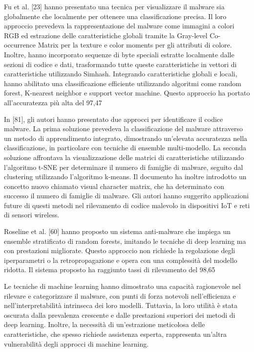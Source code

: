 Fu et al. [23] hanno presentato una tecnica per visualizzare il malware sia globalmente che localmente per ottenere una classificazione precisa. Il loro approccio prevedeva la rappresentazione del malware come immagini a colori RGB ed estrazione delle caratteristiche globali tramite la Gray-level Co-occurrence Matrix per la texture e color moments per gli attributi di colore. Inoltre, hanno incorporato sequenze di byte speciali estratte localmente dalle sezioni di codice e dati, trasformando tutte queste caratteristiche in vettori di caratteristiche utilizzando Simhash. Integrando caratteristiche globali e locali, hanno abilitato una classificazione efficiente utilizzando algoritmi come random forest, K-nearest neighbor e support vector machine. Questo approccio ha portato all'accuratezza più alta del 97,47%

In [81], gli autori hanno presentato due approcci per identificare il codice malware. La prima soluzione prevedeva la classificazione del malware attraverso un metodo di apprendimento integrato, dimostrando un'elevata accuratezza nella classificazione, in particolare con tecniche di ensemble multi-modello. La seconda soluzione affrontava la visualizzazione delle matrici di caratteristiche utilizzando l'algoritmo t-SNE per determinare il numero di famiglie di malware, seguito dal clustering utilizzando l'algoritmo k-means. Il documento ha inoltre introdotto un concetto nuovo chiamato visual character matrix, che ha determinato con successo il numero di famiglie di malware. Gli autori hanno suggerito applicazioni future di questi metodi nel rilevamento di codice malevolo in dispositivi IoT e reti di sensori wireless.

Roseline et al. [60] hanno proposto un sistema anti-malware che impiega un ensemble stratificato di random forests, imitando le tecniche di deep learning ma con prestazioni migliorate. Questo approccio non richiede la regolazione degli iperparametri o la retropropagazione e opera con una complessità del modello ridotta. Il sistema proposto ha raggiunto tassi di rilevamento del 98,65%

Le tecniche di machine learning hanno dimostrato una capacità ragionevole nel rilevare e categorizzare il malware, con punti di forza notevoli nell'efficienza e nell'interpretabilità intrinseca dei loro modelli. Tuttavia, la loro utilità è stata oscurata dalla prevalenza crescente e dalle prestazioni superiori dei metodi di deep learning. Inoltre, la necessità di un'estrazione meticolosa delle caratteristiche, che spesso richiede assistenza esperta, rappresenta un'altra vulnerabilità degli approcci di machine learning.

